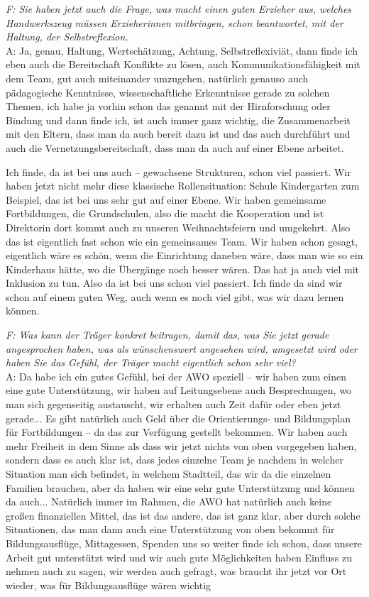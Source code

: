 \begin{linenumbers*}
\emph{F: Sie haben jetzt auch die Frage, was macht einen guten Erzieher aus, welches Handwerkszeug müssen Erzieherinnen mitbringen, schon beantwortet, mit der Haltung, der Selbstreflexion.}\\
A: Ja, genau, Haltung, Wertschätzung, Achtung, Selbstreflexiviät, dann finde ich eben auch die Bereitschaft Konflikte zu lösen, auch Kommunikationsfähigkeit mit dem Team, gut auch miteinander umzugehen, natürlich genauso auch pädagogische Kenntnisse, wissenschaftliche Erkenntnisse gerade zu solchen Themen, ich habe ja vorhin schon das genannt mit der Hirnforschung oder Bindung und dann finde ich, ist auch immer ganz wichtig, die Zusammenarbeit mit den Eltern, dass man da auch bereit dazu ist und das auch durchführt und auch die Vernetzungsbereitschaft, dass man da auch auf einer Ebene arbeitet. 

Ich finde, da ist bei uns auch -- gewachsene Strukturen, schon viel passiert. Wir haben jetzt nicht mehr diese klassische Rollensituation: Schule Kindergarten zum Beispiel, das ist bei uns sehr gut auf einer Ebene. Wir haben gemeinsame Fortbildungen, die Grundschulen, also die macht die Kooperation und ist Direktorin dort kommt auch zu unseren Weihnachtsfeiern und umgekehrt. Also das ist eigentlich fast schon wie ein gemeinsames Team. Wir haben schon gesagt, eigentlich wäre es schön, wenn die Einrichtung daneben wäre, dass man wie so ein Kinderhaus hätte, wo die Übergänge noch besser wären. Das hat ja auch viel mit Inklusion zu tun. Also da ist bei uns schon viel passiert. Ich finde da sind wir schon auf einem guten Weg, auch wenn es noch viel gibt, was wir dazu lernen können. 

\emph{F: Was kann der Träger konkret beitragen, damit das, was Sie jetzt gerade angesprochen haben, was als wünschenswert angesehen wird, umgesetzt wird oder haben Sie das Gefühl, der Träger macht eigentlich schon sehr viel?}\\
A: Da habe ich ein gutes Gefühl, bei der AWO speziell -- wir haben zum einen eine gute Unterstützung, wir haben auf Leitungsebene auch Besprechungen, wo man sich gegenseitig austauscht, wir erhalten auch Zeit dafür oder eben jetzt gerade... Es gibt natürlich auch Geld über die Orientierungs- und Bildungsplan für Fortbildungen -- da das zur Verfügung gestellt bekommen. Wir haben auch mehr Freiheit in dem Sinne als dass wir jetzt nichts von oben vorgegeben haben, sondern dass es auch klar ist, dass jedes einzelne Team je nachdem in welcher Situation man sich befindet, in welchem Stadtteil, das wir da die einzelnen Familien brauchen, aber da haben wir eine sehr gute Unterstützung und können da auch... Natürlich immer im Rahmen, die AWO hat natürlich auch keine großen finanziellen Mittel, das ist das andere, das ist ganz klar, aber durch solche Situationen, das man dann auch eine Unterstützung von oben bekommt für Bildungsausflüge, Mittagessen, Spenden uns so weiter finde ich schon, dass unsere Arbeit gut unterstützt wird und wir auch gute Möglichkeiten haben Einfluss zu nehmen auch zu sagen, wir werden auch gefragt, was braucht ihr jetzt vor Ort wieder, was für Bildungsausflüge wären wichtig 


\end{linenumbers*}

